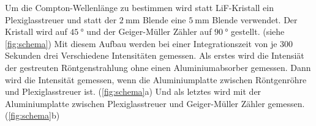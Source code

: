 Um die Compton-Wellenlänge zu bestimmen wird statt LiF-Kristall ein Plexiglasstreuer und statt der $\SI{2}{\milli\metre}$ Blende eine $\SI{5}{\milli\metre}$ Blende verwendet.
Der Kristall wird auf $\SI{45}{\degree}$ und der Geiger-Müller Zähler auf $\SI{90}{\degree}$ gestellt. (siehe \autoref{fig:schema})
Mit diesem Aufbau werden bei einer Integrationszeit von je 300 Sekunden drei Verschiedene Intensitäten gemessen.
Als erstes wird die Intensiät der gestreuten Röntgenstrahlung ohne einen Aluminiumabsorber gemessen.
Dann wird die Intensität gemessen, wenn die Aluminiumplatte zwischen Röntgenröhre und Plexiglasstreuer ist. (\autoref{fig:schema}a)
Und als letztes wird mit der Aluminiumplatte zwischen Plexiglasstreuer und Geiger-Müller Zähler gemessen. (\autoref{fig:schema}b)